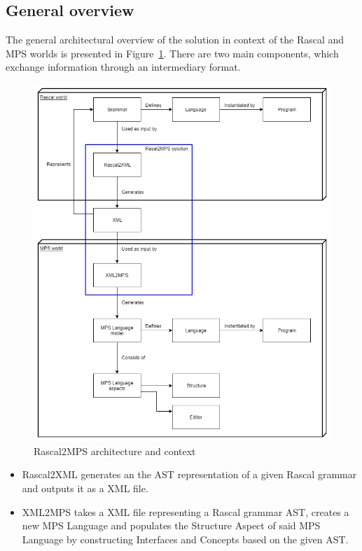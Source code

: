 \documentclass[a4paper]{article}
\begin{document}
\subsection{General overview}

The general architectural overview of the solution in context of the Rascal and MPS worlds is presented in Figure~\ref{fig:world}. There are two main components, which exchange information through an intermediary format. 

\begin{figure}[h]
	\centering
	\includegraphics[scale=0.4]{images/World_Definition.png}
	\caption{Rascal2MPS architecture and context}
	\label{fig:world}
\end{figure}

\begin{itemize}
	\item Rascal2XML generates an  the AST representation of a given Rascal grammar and outputs it as a XML file. 
	\item XML2MPS takes a XML file representing a Rascal grammar AST, creates a new MPS Language and populates the Structure Aspect of said MPS Language by constructing Interfaces and Concepts based on the given AST.  
\end{itemize}
\end{document}

